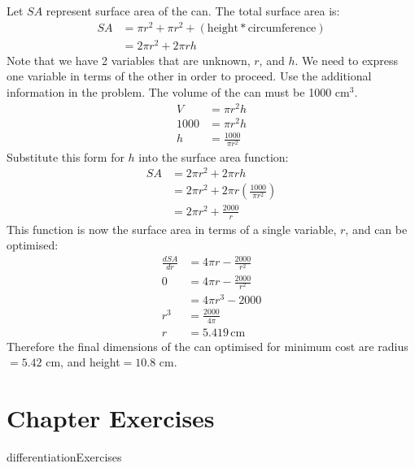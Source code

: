 Let $SA$ represent surface area of the can. The total surface area is:
\begin{align*}
SA&=\pi r^2 + \pi r^2 + \left(\textrm{height}*\textrm{circumference}\right)\\
&=2\pi r^2+2\pi rh
\end{align*}
Note that we have 2 variables that are unknown, $r$, and $h$. We need to express one variable in terms of the other in order to proceed. Use the additional information in the problem. The volume of the can must be 1000 cm$^3$.
\begin{align*}
V&=\pi r^2 h\\
1000&=\pi r^2 h\\
h&=\frac{1000}{\pi r^2}
\end{align*}
Substitute this form for $h$ into the surface area function:
\begin{align*}
SA&=2\pi r^2+2\pi rh\\
&=2\pi r^2+2\pi r\left(\frac{1000}{\pi r^2} \right)\\
&=2\pi r^2+\frac{2000}{r}
\end{align*}
This function is now the surface area in terms of a single variable, $r$, and can be optimised:
\begin{align*}
\frac{dSA}{dr}&=4\pi r-\frac{2000}{r^2}\\
0&=4\pi r-\frac{2000}{r^2}\\
&=4\pi r^3-2000\\
r^3&=\frac{2000}{4\pi}\\
r&=5.419 \,\textrm{cm}
\end{align*}
Therefore the final dimensions of the can optimised for minimum cost are radius$=5.42$ cm, and height$=10.8$ cm. 
 \clearpage
 \section{Chapter Exercises}
 {differentiationExercises}
